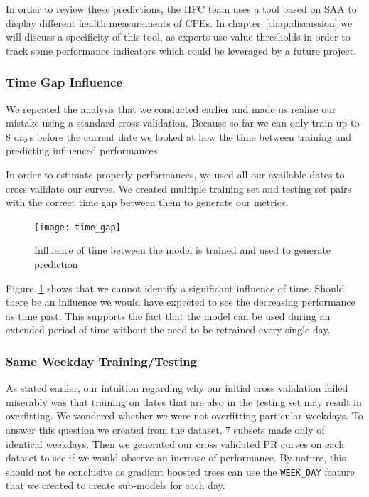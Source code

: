 In order to review these predictions, the HFC team uses a tool based on SAA to display different health measurements of CPEs. In chapter~\ref{chap:discussion} we will discuss a specificity of this tool, as experts use value thresholds in order to track some performance indicators which could be leveraged by a future project.

\subsubsection{Time Gap Influence}
We repeated the analysis that we conducted earlier and made us realise our mistake using a standard cross validation. Because so far we can only train up to 8 days before the current date we looked at how the time between training and predicting influenced performances.

In order to estimate properly performances, we used all our available dates to cross validate our curves. We created multiple training set and testing set pairs with the correct time gap between them to generate our metrics. 

\begin{figure}[ht]
    \begin{center}
    \texttt{[image: time\_gap]}
    \end{center}
    \caption{Influence of time between the model is trained and used to generate prediction}
    \label{time_gap}
\end{figure}

Figure~\ref{time_gap} shows that we cannot identify a significant influence of time. Should there be an influence we would have expected to see the decreasing performance as time past. This supports the fact that the model can be used during an extended period of time without the need to be retrained every single day. 

\subsubsection{Same Weekday Training/Testing}
As stated earlier, our intuition regarding why our initial cross validation failed miserably was that training on dates that are also in the testing set may result in overfitting. We wondered whether we were not overfitting particular weekdays. To answer this question we created from the dataset, 7 subsets made only of identical weekdays. Then we generated our cross validated PR curves on each dataset to see if we would observe an increase of performance. By nature, this should not be conclusive as gradient boosted trees can use the \texttt{WEEK\_DAY} feature that we created to create sub-models for each day. 

